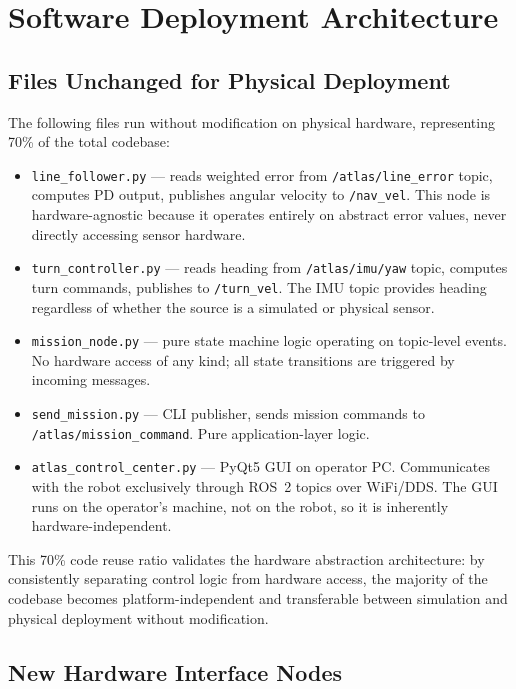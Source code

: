 \documentclass[12pt,a4paper,oneside]{report}
\begin{document}
\section{Software Deployment Architecture}

\subsection{Files Unchanged for Physical Deployment}

The following files run without modification on physical hardware, representing 70\% of the total codebase:

\begin{itemize}
\item \texttt{line\_follower.py} --- reads weighted error from \texttt{/atlas/line\_error} topic, computes PD output, publishes angular velocity to \texttt{/nav\_vel}. This node is hardware-agnostic because it operates entirely on abstract error values, never directly accessing sensor hardware.

\item \texttt{turn\_controller.py} --- reads heading from \texttt{/atlas/imu/yaw} topic, computes turn commands, publishes to \texttt{/turn\_vel}. The IMU topic provides heading regardless of whether the source is a simulated or physical sensor.

\item \texttt{mission\_node.py} --- pure state machine logic operating on topic-level events. No hardware access of any kind; all state transitions are triggered by incoming messages.

\item \texttt{send\_mission.py} --- CLI publisher, sends mission commands to \texttt{/atlas/mission\_command}. Pure application-layer logic.

\item \texttt{atlas\_control\_center.py} --- PyQt5 GUI on operator PC. Communicates with the robot exclusively through ROS~2 topics over WiFi/DDS. The GUI runs on the operator's machine, not on the robot, so it is inherently hardware-independent.
\end{itemize}

This 70\% code reuse ratio validates the hardware abstraction architecture: by consistently separating control logic from hardware access, the majority of the codebase becomes platform-independent and transferable between simulation and physical deployment without modification.

\subsection{New Hardware Interface Nodes}
\end{document}
